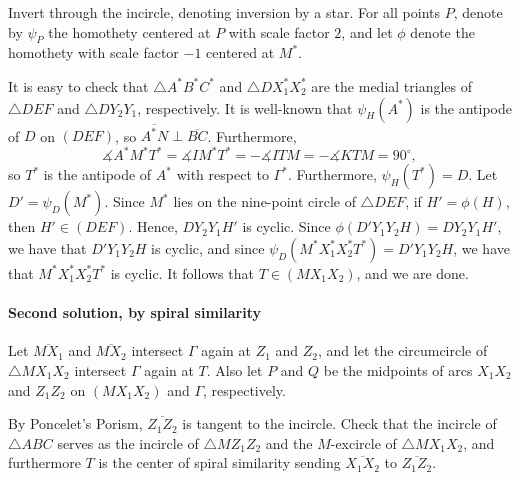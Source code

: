 Invert through the incircle, denoting inversion by a star. For all points $P$, denote by $\psi_P$ the homothety centered at $P$ with scale factor $2$, and let $\phi$ denote the homothety with scale factor $-1$ centered at $M^*$.

It is easy to check that $\triangle A^*B^*C^*$ and $\triangle DX_1^*X_2^*$ are the medial triangles of $\triangle DEF$ and $\triangle DY_2Y_1$, respectively. It is well-known that $\psi_H(A^*)$ is the antipode of $D$ on $(DEF)$, so $\overline{A^*N}\perp\overline{BC}$. Furthermore, \[\measuredangle A^*M^*T^*=\measuredangle IM^*T^*=-\measuredangle ITM=-\measuredangle KTM=90^\circ,\]
so $T^*$ is the antipode of $A^*$ with respect to $\Gamma^*$. Furthermore, $\psi_H(T^*)=D$. Let $D'=\psi_D(M^*)$. Since $M^*$ lies on the nine-point circle of $\triangle DEF$, if $H'=\phi(H)$, then $H'\in(DEF)$. Hence, $DY_2Y_1H'$ is cyclic. Since $\phi(D'Y_1Y_2H)=DY_2Y_1H'$, we have that $D'Y_1Y_2H$ is cyclic, and since $\psi_D(M^*X_1^*X_2^*T^*)=D'Y_1Y_2H$, we have that $M^*X_1^*X_2^*T^*$ is cyclic. It follows that $T\in(MX_1X_2)$, and we are done. 

\paragraph{Second solution, by spiral similarity}     Let $\overline{MX_1}$ and $\overline{MX_2}$ intersect $\Gamma$ again at $Z_1$ and $Z_2$, and let the circumcircle of $\triangle MX_1X_2$ intersect $\Gamma$ again at $T$. Also let $P$ and $Q$ be the midpoints of arcs $X_1X_2$ and $Z_1Z_2$ on $(MX_1X_2)$ and $\Gamma$, respectively.

By Poncelet's Porism, $\overline{Z_1Z_2}$ is tangent to the incircle. Check that the incircle of $\triangle ABC$ serves as the incircle of $\triangle MZ_1Z_2$ and the $M$-excircle of $\triangle MX_1X_2$, and furthermore $T$ is the center of spiral similarity sending $\overline{X_1X_2}$ to $\overline{Z_1Z_2}$. 

